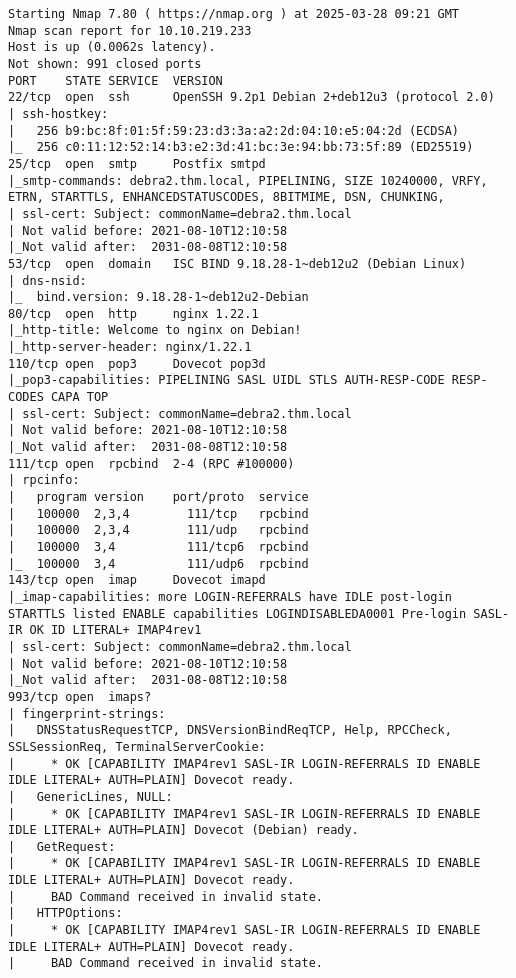 \documentclass[11pt]{article}  %
\newenvironment{commandbox}[1][]{
  \begin{tcolorbox}[
      colback=kalibackground,
      colframe=commandcolor,
      fonttitle=\bfseries\color{white},
      title=#1,
      breakable=true
    ]
  }{
  \end{tcolorbox}
}
\begin{document}
\begin{commandbox}[Aggressive Scan]
\begin{lstlisting}[basicstyle=\normalsize\ttfamily\color{kalitext}]
Starting Nmap 7.80 ( https://nmap.org ) at 2025-03-28 09:21 GMT
Nmap scan report for 10.10.219.233
Host is up (0.0062s latency).
Not shown: 991 closed ports
PORT    STATE SERVICE  VERSION
22/tcp  open  ssh      OpenSSH 9.2p1 Debian 2+deb12u3 (protocol 2.0)
| ssh-hostkey:
|   256 b9:bc:8f:01:5f:59:23:d3:3a:a2:2d:04:10:e5:04:2d (ECDSA)
|_  256 c0:11:12:52:14:b3:e2:3d:41:bc:3e:94:bb:73:5f:89 (ED25519)
25/tcp  open  smtp     Postfix smtpd
|_smtp-commands: debra2.thm.local, PIPELINING, SIZE 10240000, VRFY, ETRN, STARTTLS, ENHANCEDSTATUSCODES, 8BITMIME, DSN, CHUNKING,
| ssl-cert: Subject: commonName=debra2.thm.local
| Not valid before: 2021-08-10T12:10:58
|_Not valid after:  2031-08-08T12:10:58
53/tcp  open  domain   ISC BIND 9.18.28-1~deb12u2 (Debian Linux)
| dns-nsid:
|_  bind.version: 9.18.28-1~deb12u2-Debian
80/tcp  open  http     nginx 1.22.1
|_http-title: Welcome to nginx on Debian!
|_http-server-header: nginx/1.22.1
110/tcp open  pop3     Dovecot pop3d
|_pop3-capabilities: PIPELINING SASL UIDL STLS AUTH-RESP-CODE RESP-CODES CAPA TOP
| ssl-cert: Subject: commonName=debra2.thm.local
| Not valid before: 2021-08-10T12:10:58
|_Not valid after:  2031-08-08T12:10:58
111/tcp open  rpcbind  2-4 (RPC #100000)
| rpcinfo:
|   program version    port/proto  service
|   100000  2,3,4        111/tcp   rpcbind
|   100000  2,3,4        111/udp   rpcbind
|   100000  3,4          111/tcp6  rpcbind
|_  100000  3,4          111/udp6  rpcbind
143/tcp open  imap     Dovecot imapd
|_imap-capabilities: more LOGIN-REFERRALS have IDLE post-login STARTTLS listed ENABLE capabilities LOGINDISABLEDA0001 Pre-login SASL-IR OK ID LITERAL+ IMAP4rev1
| ssl-cert: Subject: commonName=debra2.thm.local
| Not valid before: 2021-08-10T12:10:58
|_Not valid after:  2031-08-08T12:10:58
993/tcp open  imaps?
| fingerprint-strings:
|   DNSStatusRequestTCP, DNSVersionBindReqTCP, Help, RPCCheck, SSLSessionReq, TerminalServerCookie:
|     * OK [CAPABILITY IMAP4rev1 SASL-IR LOGIN-REFERRALS ID ENABLE IDLE LITERAL+ AUTH=PLAIN] Dovecot ready.
|   GenericLines, NULL:
|     * OK [CAPABILITY IMAP4rev1 SASL-IR LOGIN-REFERRALS ID ENABLE IDLE LITERAL+ AUTH=PLAIN] Dovecot (Debian) ready.
|   GetRequest:
|     * OK [CAPABILITY IMAP4rev1 SASL-IR LOGIN-REFERRALS ID ENABLE IDLE LITERAL+ AUTH=PLAIN] Dovecot ready.
|     BAD Command received in invalid state.
|   HTTPOptions:
|     * OK [CAPABILITY IMAP4rev1 SASL-IR LOGIN-REFERRALS ID ENABLE IDLE LITERAL+ AUTH=PLAIN] Dovecot ready.
|     BAD Command received in invalid state.

\end{lstlisting}
\end{commandbox}
\end{document}
